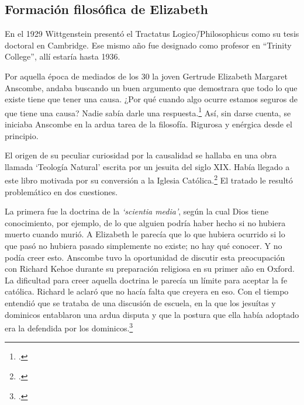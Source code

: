 \subsection{Formación filosófica de Elizabeth}

En el 1929 Wittgenstein presentó el Tractatus Logico\=/Philosophicus como su
tesis doctoral en Cambridge. Ese mismo año fue designado como profesor en
``Trinity College'', allí estaría hasta 1936.


Por aquella época de mediados de los 30 la joven Gertrude Elizabeth Margaret
Anscombe, andaba buscando un buen argumento que demostrara que todo lo que
existe tiene que tener una causa. ¿Por qué cuando algo ocurre estamos seguros de
que tiene una causa? Nadie sabía darle una respuesta.\footcite[cf.~][p.~vii
\S1]{M&PotM} Así, sin darse cuenta, se iniciaba Anscombe en la ardua tarea de la
filosofía. Rigurosa y enérgica desde el principio.

El origen de su peculiar curiosidad por la causalidad se hallaba en una obra
llamada `Teología Natural' escrita por un jesuita del siglo XIX. Había llegado a
este libro motivada por su conversión a la Iglesia
Católica.\footcite[cf.~][p.~vii \S1]{M&PotM} El tratado le resultó problemático
en dos cuestiones.

La primera fue la doctrina de la \emph{`scientia media'}, según la cual Dios
tiene conocimiento, por ejemplo, de lo que alguien podría haber hecho si no
hubiera muerto cuando murió. A Elizabeth le parecía que lo que hubiera ocurrido
si lo que pasó no hubiera pasado simplemente no existe; no hay qué conocer. Y no
podía creer esto. Anscombe tuvo la oportunidad de discutir esta preocupación con
Richard Kehoe durante su preparación religiosa en su primer año en Oxford. La
dificultad para creer aquella doctrina le parecía un límite para aceptar la fe
católica. Richard le aclaró que no hacía falta que creyera en eso. Con el tiempo
entendió que se trataba de una discusión de escuela, en la que los jesuítas y
dominicos entablaron una ardua disputa y que la postura que ella había adoptado
era la defendida por los dominicos.\footcite[cf.~][p.~vii]{M&PotM}

